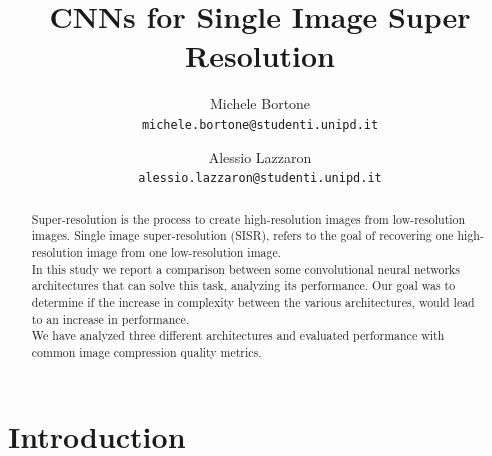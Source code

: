 \documentclass[10pt,twocolumn,letterpaper]{article}
\begin{document}
\title{CNNs for Single Image Super Resolution}

\author{Michele Bortone\\
{\tt\small michele.bortone@studenti.unipd.it}
\and
Alessio Lazzaron\\
{\tt\small alessio.lazzaron@studenti.unipd.it}
}

\maketitle

\begin{abstract}
   	Super-resolution is the process to create high-resolution images from low-resolution images.
   	Single image super-resolution (SISR), refers to the goal of recovering one high-resolution image from one low-resolution image.\\
    In this study we report a comparison between some convolutional neural networks architectures that can solve this task, analyzing its performance. Our goal was to determine if the increase in complexity between the various architectures,  would lead to an increase in performance.\\
    We have analyzed three different architectures and evaluated performance with common image compression quality metrics.
    
\end{abstract}

\section{Introduction}
\end{document}
